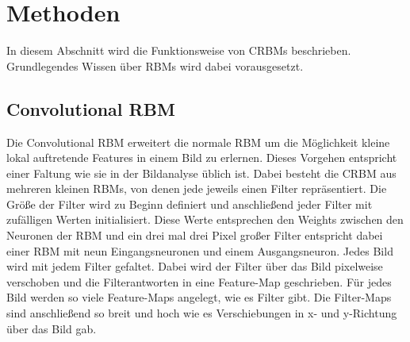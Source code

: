 \section{Methoden}\label{methods}
In diesem Abschnitt wird die Funktionsweise von CRBMs beschrieben.
Grundlegendes Wissen über RBMs wird dabei vorausgesetzt.

\subsection{Convolutional RBM}\label{CRBM}
Die Convolutional RBM erweitert die normale RBM um die Möglichkeit kleine lokal auftretende Features in einem Bild zu erlernen.
Dieses Vorgehen entspricht einer Faltung wie sie in der Bildanalyse üblich ist.
Dabei besteht die CRBM aus mehreren kleinen RBMs, von denen jede jeweils einen Filter repräsentiert.
Die Größe der Filter wird zu Beginn definiert und anschließend jeder Filter mit zufälligen Werten initialisiert.
Diese Werte entsprechen den Weights zwischen den Neuronen der RBM und ein drei mal drei Pixel großer Filter entspricht dabei einer RBM mit neun Eingangsneuronen und einem Ausgangsneuron.
Jedes Bild wird mit jedem Filter gefaltet.
Dabei wird der Filter über das Bild pixelweise verschoben und die Filterantworten in eine Feature-Map geschrieben.
Für jedes Bild werden so viele Feature-Maps angelegt, wie es Filter gibt.
Die Filter-Maps sind anschließend so breit und hoch wie es Verschiebungen in x- und y-Richtung über das Bild gab.

